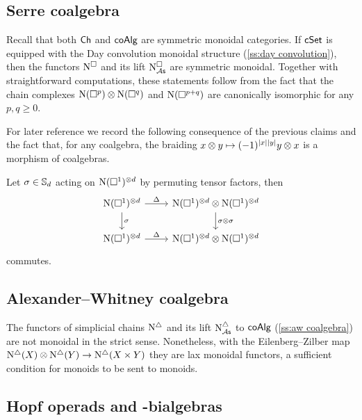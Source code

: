 \subsection{Serre coalgebra} \label{ss:serre coalgebra sym monoidal}

Recall that both $\Ch$ and $\coAlg$ are symmetric monoidal categories.
If $\cSet$ is equipped with the Day convolution monoidal structure (\cref{ss:day convolution}), then the functors $\cchains$ and its lift $\cchainsAs$ are symmetric monoidal.
Together with straightforward computations, these statements follow from the fact that the chain complexes $\chains(\cube^p) \otimes \chains(\cube^q)$ and $\chains(\cube^{p+q})$ are canonically isomorphic for any $p, q \geq 0$.

For later reference we record the following consequence of the previous claims and the fact that, for any coalgebra, the braiding $x \otimes y \mapsto (-1)^{\bars{x} \bars{y}} y \otimes x$ is a morphism of coalgebras.

\begin{lemma} \label{l:serre diagonal invariant}
	Let $\sigma \in \S_d$ acting on $\chains(\cube^1)^{\otimes d}$ by permuting tensor factors, then
	\[
	\begin{tikzcd}
	\chains(\cube^1)^{\otimes d} \arrow[r, "\Delta"] \arrow[d, "\sigma"] &
	\chains(\cube^1)^{\otimes d} \otimes \chains(\cube^1)^{\otimes d} \arrow[d, "\sigma \otimes \sigma"] \\
	\chains(\cube^1)^{\otimes d} \arrow[r, "\Delta"] &
	\chains(\cube^1)^{\otimes d} \otimes \chains(\cube^1)^{\otimes d}
	\end{tikzcd}
	\]
	commutes.
\end{lemma}

\subsection{Alexander--Whitney coalgebra}

The functors of simplicial chains $\schains$ and its lift $\schainsAs$ to $\coAlg$ (\cref{ss:aw coalgebra}) are not monoidal in the strict sense.
Nonetheless, with the Eilenberg--Zilber map $\schains(X) \otimes \schains(Y) \to \schains(X \times Y)$ they are lax monoidal functors, a sufficient condition for monoids to be sent to monoids.

\subsection{Hopf operads and \pdfEinfty-bialgebras}


